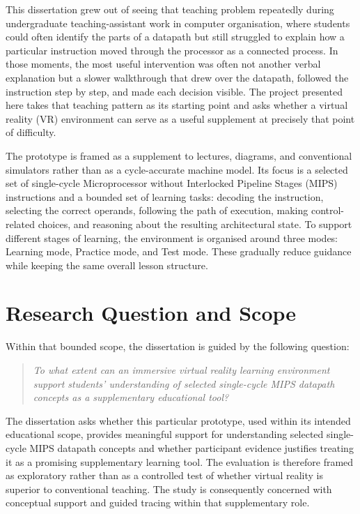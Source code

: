 This dissertation grew out of seeing that teaching problem repeatedly during undergraduate teaching-assistant work in computer organisation, where students could often identify the parts of a datapath but still struggled to explain how a particular instruction moved through the processor as a connected process. In those moments, the most useful intervention was often not another verbal explanation but a slower walkthrough that drew over the datapath, followed the instruction step by step, and made each decision visible. The project presented here takes that teaching pattern as its starting point and asks whether a virtual reality (VR) environment can serve as a useful supplement at precisely that point of difficulty.

The prototype is framed as a supplement to lectures, diagrams, and conventional simulators rather than as a cycle-accurate machine model. Its focus is a selected set of single-cycle Microprocessor without Interlocked Pipeline Stages (MIPS) instructions and a bounded set of learning tasks: decoding the instruction, selecting the correct operands, following the path of execution, making control-related choices, and reasoning about the resulting architectural state. To support different stages of learning, the environment is organised around three modes: Learning mode, Practice mode, and Test mode. These gradually reduce guidance while keeping the same overall lesson structure.

\section{Research Question and Scope}

Within that bounded scope, the dissertation is guided by the following question:

\begin{quote}
\textit{To what extent can an immersive virtual reality learning environment support students' understanding of selected single-cycle MIPS datapath concepts as a supplementary educational tool?}
\end{quote}

The dissertation asks whether this particular prototype, used within its intended educational scope, provides meaningful support for understanding selected single-cycle MIPS datapath concepts and whether participant evidence justifies treating it as a promising supplementary learning tool. The evaluation is therefore framed as exploratory rather than as a controlled test of whether virtual reality is superior to conventional teaching. The study is consequently concerned with conceptual support and guided tracing within that supplementary role.

